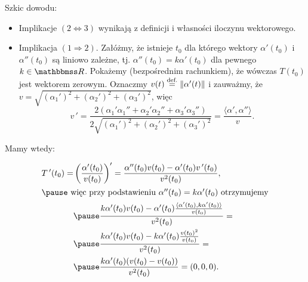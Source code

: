 \begin{frame}
\textcolor{ared}{Szkic dowodu:}

\begin{itemize}
\pause\item Implikacje $(2\Leftrightarrow 3)$ wynikają z definicji i własności iloczynu wektorowego.
\pause \item Implikacja $(1\Rightarrow 2)$.
Załóżmy, że istnieje $t_0$ dla którego wektory $\alpha'(t_0)$ i $\alpha''(t_0)$ są liniowo zależne, tj. $\alpha''(t_0)=k\alpha'(t_0)$ dla pewnego $k\in \R$. \pause Pokażemy (bezpośrednim rachunkiem), że wówczas $T(t_0)$ jest wektorem zerowym. \pause Oznaczmy $v(t)\define\|\alpha'(t)\|$ i zauważmy, że $v=\sqrt{(\alpha_1')^2+(\alpha_2')^2+(\alpha_3')^2}$, \pause więc \[v\,'=\frac{2(\alpha_1'\alpha_1''+\alpha_2'\alpha_2''+\alpha_3'\alpha_3'')}{2\sqrt{(\alpha_1')^2+(\alpha_2')^2+(\alpha_3')^2}}=\frac{\langle\alpha',\alpha''\rangle}{v}.\]
\end{itemize}
\end{frame}
\begin{frame}[<+->]
Mamy wtedy:

\begin{align*}
T\,'(t_0)=&\left(\frac{\alpha'(t_0)}{v(t_0)}\right)'=\frac{\alpha''(t_0) v(t_0)-\alpha'(t_0)v\,'(t_0)}{v^2(t_0)}, \\
\intertext{\pause więc przy podstawieniu $\alpha''(t_0)=k\alpha'(t_0)$ otrzymujemy}
&\pause \frac{k\alpha'(t_0)v(t_0)-\alpha'(t_0)\frac{\langle \alpha'(t_0),k\alpha'(t_0)\rangle}{v(t_0)}}{v^2(t_0)}=\\
&\pause \frac{k\alpha'(t_0)v(t_0)-k\alpha'(t_0)\frac{v(t_0)^2}{v(t_0)}}{v^2(t_0)}=\\
&\pause\frac{k\alpha'(t_0)(v(t_0)-v(t_0))}{v^2(t_0)}=(0,0,0).
\end{align*}

\end{frame}
